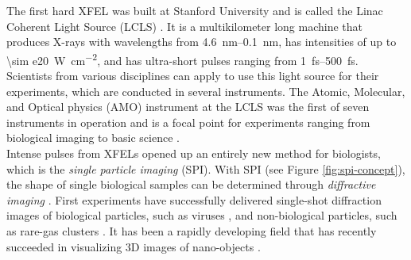 %
The first hard XFEL was built at Stanford University and is called the Linac Coherent Light Source (LCLS) \citep{Emma-2010-NatPho}. It is a multikilometer long machine that produces X-rays with wavelengths from \SIrange{4.6}{0.1}{\nano\meter}, has intensities of up to \SI{\sim e20}{\watt\per\square\centi\meter}, and has ultra-short pulses ranging from \SIrange{1}{500}{\femto\second}. Scientists from various disciplines can apply to use this light source for their experiments, which are conducted in several instruments. The Atomic, Molecular, and Optical physics (AMO) instrument \cite{Ferguson-2015-JSR} at the LCLS was the first of seven instruments in operation and is a focal point for experiments ranging from biological imaging to basic science \citep{Bostedt-2016-RMP}.\\[1\baselineskip]
%
Intense pulses from XFELs opened up an entirely new method for biologists, which is the \textit{single particle imaging} (SPI). With SPI (see Figure \ref{fig:spi-concept}), the shape of single biological samples can be determined through \textit{diffractive imaging} \citep{Chapman-2006-NatPhys}. First experiments have successfully delivered single-shot diffraction images of biological particles, such as viruses \citep{Seibert-2011-Nature}, and non-biological particles, such as rare-gas clusters \citep{Gomez-2014-Science}. It has been a rapidly developing field that has recently succeeded in visualizing 3D images of nano-objects \citep{Ekeberg-2015-PRL,Barke-2015-NatComm}.\\[1\baselineskip]
%
%
